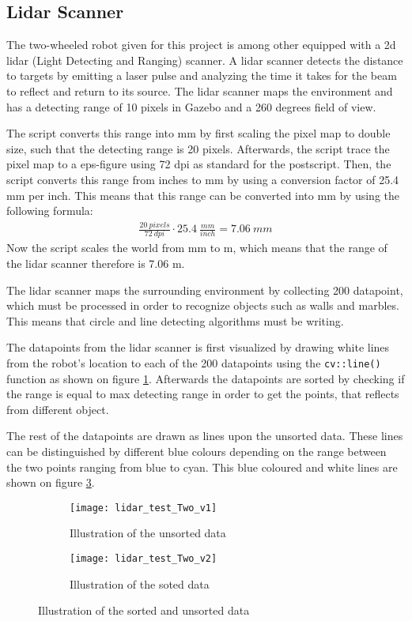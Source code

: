 \documentclass[../Head/Main.tex]{subfiles}
\begin{document}
\subsection{Lidar Scanner}
The two-wheeled robot given for this project is among other equipped with a 2d lidar (Light Detecting and Ranging) scanner. A lidar scanner detects the distance to targets by emitting a laser pulse and analyzing the time it takes for the beam to reflect and return to its source. The lidar scanner maps the environment and has a detecting range of 10 pixels in Gazebo and a 260 degrees field of view. \par
The script converts this range into mm by first scaling the pixel map to double size, such that the detecting range is 20 pixels. Afterwards, the script trace the pixel map to a eps-figure using 72 dpi as standard 
for the postscript. Then, the script converts this range from inches to mm by using a conversion factor of 25.4 mm per inch. This means that this range can be converted into mm by using the following formula:
\begin{align*}
\frac{20~pixels}{72~dpi}\cdot 25.4~\frac{mm}{inch} = 7.06~mm
\end{align*}
Now the script scales the world from mm to m, which means that the range of the lidar scanner therefore is 7.06 m.\par
The lidar scanner maps the surrounding environment by collecting 200 datapoint, which must be processed in order to recognize objects such as walls and marbles. This means that circle and line detecting algorithms must be writing. \par
The datapoints from the lidar scanner is first visualized by drawing white lines from the robot’s location to each of the 200 datapoints using the \texttt{cv::line()} function as shown on figure \ref{fig:white_lines}. Afterwards the datapoints are sorted by checking if the range is equal to max detecting range in order to get the points, that reflects from different object.\par
The rest of the datapoints are drawn as lines upon the unsorted data. These lines can be distinguished by different blue colours depending on the range between the two points ranging from blue to cyan. This blue coloured and white lines are shown on figure \ref{fig:blue_lines}.

\begin{figure}[H]
  \begin{subfigure}[b]{0.49\textwidth}
    \centering
    \texttt{[image: lidar\_test\_Two\_v1]}
    \caption{Illustration of the unsorted data}
    \label{fig:white_lines}
  \end{subfigure}
  \hfill
  \begin{subfigure}[b]{0.49\textwidth}
  	\centering
    \texttt{[image: lidar\_test\_Two\_v2]}
    \caption{Illustration of the soted data}
    \label{fig:blue_lines}
  \end{subfigure}
  \caption{Illustration of the sorted and unsorted data}
\end{figure}


\end{document}
